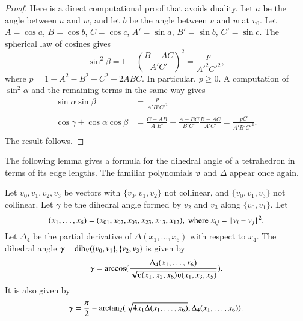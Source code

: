 \begin{proof}  
Here is a direct
computational proof that avoids duality.
Let $a$ be the angle between $u$ and $w$, and let $b$ be the angle
between $v$ and $w$ at $v_0$.
Let $A=\cos a$, $B=\cos b$, $C=\cos c$,
$A'=\sin a$, $B'=\sin b$, $C'=\sin c$.  The
spherical law of cosines gives
   $$\sin^2\beta = 1-\left(\frac{B-A C}{A' C'}\right)^2
     = \frac{p}{A'^2 C'^2},$$
where $p=1-A^2 - B^2 - C^2 + 2 A B C$.
In particular, $p\ge 0$.
A computation of $\sin^2\alpha$ and the remaining terms in the same way gives
   $$
   \begin{array}{lll}
     \sin\alpha\sin\beta &= \frac{p}{A' B' C'^2}\\ 
      \\
     \cos\gamma + \cos\alpha \cos\beta &=
         \frac{C - A B}{A' B'} + \frac{A - B C}{B' C'} \frac{B - A C}{A' C'}
         = \frac{p C}{A' B' C'^2}.\\
   \end{array}
   $$
The result follows.
\end{proof}

The following lemma gives a formula for the dihedral angle
of a tetrahedron in terms of its edge lengths.  The
familiar polynomials $\ups$ and $\Delta$ appear once again.


\begin{lemma} \label{lemma:dihform}
Let $v_0,v_1,v_2,v_3$ 
be vectors with $\{v_0,v_1,v_2\}$ not collinear, 
and $\{v_0,v_1,v_3\}$ not
collinear. 
Let $\gamma$ be the dihedral angle formed
by $v_2$ and $v_3$ along $\{v_0,v_1\}$. Let
    $$(x_1,\ldots,x_6) = 
    (x_{01},x_{02},x_{03},x_{23},x_{13},x_{12}),
    \text{ where } x_{ij}={\hskip0.1em|\hskip-0.15em|\hskip0.1em}v_i - v_j{\hskip0.1em|\hskip-0.15em|\hskip0.1em}^2.$$
Let $\Delta_4$ be the partial derivative of $\Delta(x_1,\ldots,x_6)$ with
respect to $x_4$.
The dihedral angle $\gamma=\operatorname{dih}_V(\{v_0,v_1\},\{v_2,v_3\}$
is given by
    $$
    \gamma=\arccos(\frac{\Delta_4(x_1,\ldots,x_6)}{\sqrt{
    \ups(x_1,x_2,x_6)\ups(x_1,x_3,x_5)}}).
    $$
It is also given by
    $$
    \gamma=\frac{\pi}{2} - {\operatorname{arctan_2}}
     ({\sqrt{4 x_1 \Delta(x_1,\ldots,x_6)}},{\Delta_4(x_1,\ldots,x_6)}).
    $$
\end{lemma}


